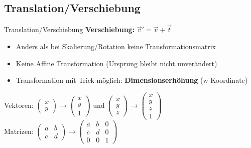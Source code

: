 \documentclass[10pt,aspectratio=169]{beamer}
\begin{document}
  \subsection{Translation/Verschiebung}
  \begin{frame}{Translation/Verschiebung}
    \textbf{Verschiebung:}
    $\vec{v}' = \vec{v} + \vec{t}$
    \begin{itemize}
      \item Anders als bei Skalierung/Rotation keine Transformationsmatrix
      \item Keine Affine Transformation (Ursprung bleibt nicht unverändert)
      \item Transformation mit Trick möglich: \textbf{Dimensionserhöhung} (w-Koordinate)
    \end{itemize}
    Vektoren: $\begin{pmatrix}
      x\\y
    \end{pmatrix}\rightarrow \begin{pmatrix}
      x\\y\\1
    \end{pmatrix}$ und $\begin{pmatrix}
      x\\y\\z
    \end{pmatrix}\rightarrow \begin{pmatrix}
      x\\y\\z\\1
    \end{pmatrix}$
    \\
    Matrizen: $\begin{pmatrix}
      a & b\\
      c & d
    \end{pmatrix}
    \rightarrow
    \begin{pmatrix}
      a & b & 0\\
      c & d & 0\\
      0 & 0 & 1
    \end{pmatrix}
    $
  \end{frame}
\end{document}

